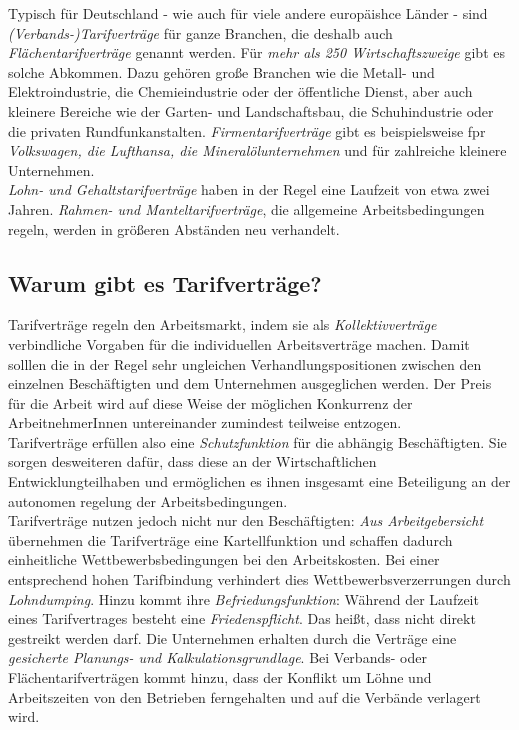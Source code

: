 \documentclass[a4paper, 12pt]{report}
\begin{document}
\begin{multicols}{2}
Typisch für Deutschland - wie auch für viele andere europäishce Länder - sind
\emph{(Verbands-)Tarifverträge} für ganze Branchen, die deshalb auch
\emph{Flächentarifverträge} genannt werden. Für \emph{mehr als 250
Wirtschaftszweige} gibt es solche Abkommen. Dazu gehören große Branchen wie die
Metall- und Elektroindustrie, die Chemieindustrie oder der öffentliche Dienst,
aber auch kleinere Bereiche wie der Garten- und Landschaftsbau, die
Schuhindustrie oder die privaten Rundfunkanstalten. \emph{Firmentarifverträge}
gibt es beispielsweise fpr \emph{Volkswagen, die Lufthansa, die
Mineralölunternehmen} und für zahlreiche kleinere Unternehmen. \\

\emph{Lohn- und Gehaltstarifverträge} haben in der Regel eine Laufzeit von etwa
zwei Jahren. \emph{Rahmen- und Manteltarifverträge}, die allgemeine
Arbeitsbedingungen regeln, werden in größeren Abständen neu verhandelt.

\subsection{Warum gibt es Tarifverträge?}

Tarifverträge regeln den Arbeitsmarkt, indem sie als \emph{Kollektivverträge}
verbindliche Vorgaben für die individuellen Arbeitsverträge machen. Damit
solllen die in der Regel sehr ungleichen Verhandlungspositionen zwischen den
einzelnen Beschäftigten und dem Unternehmen ausgeglichen werden. Der Preis für
die Arbeit wird auf diese Weise der möglichen Konkurrenz der ArbeitnehmerInnen
untereinander zumindest teilweise entzogen. \\

Tarifverträge erfüllen also eine \emph{Schutzfunktion} für die abhängig
Beschäftigten. Sie sorgen desweiteren dafür, dass diese an der Wirtschaftlichen
Entwicklungteilhaben und ermöglichen es ihnen insgesamt eine Beteiligung an der
autonomen regelung der Arbeitsbedingungen. \\

Tarifverträge nutzen jedoch nicht nur den Beschäftigten: \emph{Aus
Arbeitgebersicht} übernehmen die Tarifverträge eine Kartellfunktion und schaffen
dadurch einheitliche Wettbewerbsbedingungen bei den Arbeitskosten. Bei einer
entsprechend hohen Tarifbindung verhindert dies Wettbewerbsverzerrungen durch
\emph{Lohndumping}. Hinzu kommt ihre \emph{Befriedungsfunktion}: Während der
Laufzeit eines Tarifvertrages besteht eine \emph{Friedenspflicht}. Das heißt,
dass nicht direkt gestreikt werden darf. Die Unternehmen erhalten durch die
Verträge eine \emph{gesicherte Planungs- und Kalkulationsgrundlage}. Bei
Verbands- oder Flächentarifverträgen kommt hinzu, dass der Konflikt um Löhne und
Arbeitszeiten von den Betrieben ferngehalten und auf die Verbände verlagert
wird. \\


\end{multicols}
\end{document}
